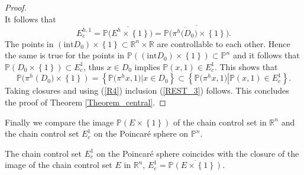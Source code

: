 \documentclass{siamltex}%
\begin{document}
\begin{proof}
\[\]
It follows that%
\begin{equation}
E_{c}^{h,1}=\overline{\mathbb{P(}E^{h}\times\left\{  1\right\}  )}%
=\overline{\mathbb{P(}\overline{\pi^{h}(D_{0}\mathbb{)}}\times\left\{
1\right\}  )}. \label{R4}%
\end{equation}
The points in $\left(  \mathrm{int}D_{0}\right)  \times\left\{  1\right\}
\subset\mathbb{R}^{n}\times\mathbb{R}$ are controllable to each other. Hence
the same is true for the points in $\mathbb{P}\left(  \left(  \mathrm{int}%
D_{0}\right)  \times\left\{  1\right\}  \right)  \subset\mathbb{P}^{n}$ and it
follows that $\mathbb{P}\left(  D_{0}\times\left\{  1\right\}  \right)
\subset E_{c}^{1}$, thus $x\in D_{0}$ implies $\mathbb{P}(x,1)\in E_{c}^{1}$.
This shows that%
\[
\mathbb{P(}\pi^{h}(D_{0}\mathbb{)}\times\left\{  1\right\}  )=\left\{
\mathbb{P(}\pi^{h}x,1)\left\vert x\in D_{0}\right.  \right\}  \subset\left\{
\mathbb{P(}\pi^{h}x,1)\left\vert \mathbb{P}(x,1)\in E_{c}^{1}\right.
\right\}  .
\]
Taking closures and using (\ref{R4}) inclusion (\ref{REST_3}) follows. This
concludes the proof of Theorem \ref{Theorem_central}.
\end{proof}

Finally we compare the image $\mathbb{P}(E\times\left\{  1\right\}  )$ of the
chain control set in $\mathbb{R}^{n}$ and the chain control set $E_{c}^{1}$ on
the Poincar\'{e} sphere on $\mathbb{P}^{n}$.

\begin{corollary}
\label{Corollary_ccs}The chain control set $E_{c}^{1}$ on the Poincar\'{e}
sphere coincides with the closure of the image of the chain control set $E$ in
$\mathbb{R}^{n}$, $E_{c}^{1}=\overline{\mathbb{P}(E\times\left\{  1\right\}
)}$.
\end{corollary}
\end{document}
